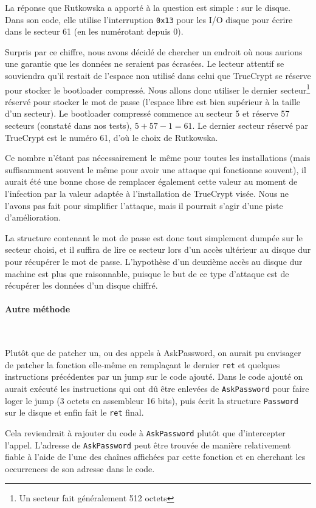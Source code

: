 \documentclass[12pt,a4paper]{article}
\begin{document}
La réponse que Rutkowska a apporté à la question est simple : sur le disque.
Dans son code, elle utilise l'interruption \texttt{0x13} pour les I/O disque pour écrire
dans le secteur 61 (en les numérotant depuis 0).

Surpris par ce chiffre, nous avons décidé de chercher un endroit où nous aurions
une garantie que les données ne seraient pas écrasées. Le lecteur attentif se
souviendra qu'il restait de l'espace non utilisé dans celui que TrueCrypt se 
réserve pour stocker le bootloader compressé. Nous allons donc utiliser le dernier
secteur\footnote{Un secteur fait généralement 512 octets} réservé pour stocker
le mot de passe (l'espace libre est bien supérieur à la taille d'un secteur).
Le bootloader compressé commence au secteur 5 et réserve 57 secteurs (constaté
dans nos tests), $5 + 57 - 1 = 61$. Le dernier secteur réservé par TrueCrypt est le
numéro 61, d'où le choix de Rutkowska.

Ce nombre n'étant pas nécessairement le même pour toutes les installations (mais
suffisamment souvent le même pour avoir une attaque qui fonctionne souvent), il
aurait été une bonne chose de remplacer également cette valeur au moment de
l'infection par la valeur adaptée à l'installation de TrueCrypt visée. Nous ne
l'avons pas fait pour simplifier l'attaque, mais il pourrait s'agir d'une piste
d'amélioration.

La structure contenant le mot de passe est donc tout simplement dumpée sur le
secteur choisi, et il suffira de lire ce secteur lors d'un accès ultérieur au
disque dur pour récupérer le mot de passe. L'hypothèse d'un deuxième accès au
disque dur machine est plus que raisonnable, puisque le but de ce type d'attaque
est de récupérer les données d'un disque chiffré.

\paragraph{Autre méthode}~

Plutôt que de patcher un, ou des appels à AskPassword, on aurait pu envisager
de patcher la fonction elle-même en remplaçant le dernier \texttt{ret} et 
quelques instructions précédentes par un jump sur le code ajouté. Dans le code
ajouté on aurait exécuté les instructions qui ont dû être enlevées de \texttt{AskPassword}
pour faire loger le jump (3 octets en assembleur 16 bits), puis écrit la structure
\texttt{Password} sur le disque et enfin fait le \texttt{ret} final.

Cela reviendrait à rajouter du code à \texttt{AskPassword} plutôt que
d'intercepter l'appel. L'adresse de \texttt{AskPassword} peut être trouvée de manière
relativement fiable à l'aide de l'une des chaînes affichées par cette fonction
et en cherchant les occurrences de son adresse dans le code.
\end{document}
